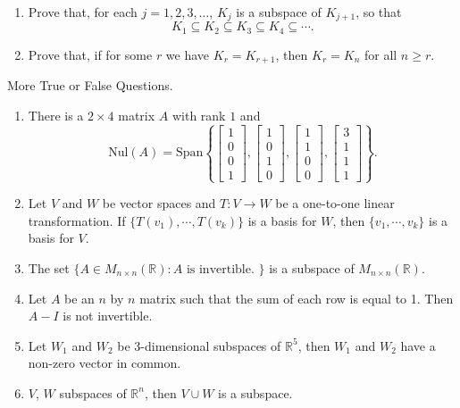 \documentclass[12pt,letterpaper]{article}
\begin{document}
\begin{enumerate}
	\begin{enumerate}
		\item Prove that, for each $j=1,2,3,\ldots$, $K_j$ is a subspace of $K_{j+1}$, so that 
		$$
		K_1\subseteq K_2 \subseteq K_3 \subseteq K_4 \subseteq\cdots.
		$$
		\item Prove that, if for some $r$ we have $K_r = K_{r+1}$, then $K_r=K_n$ for all $n\geq r$.
	\end{enumerate}
	\Problem More True or False Questions.
	\begin{enumerate}
		 \item There is a $2 \times 4$ matrix $A$ with rank $1$ and $$\mathrm{Nul}(A) = \mathrm{Span}\left\{\begin{bmatrix}1\\0\\0\\1\end{bmatrix},\begin{bmatrix}1\\0\\1\\0\end{bmatrix},\begin{bmatrix}1\\1\\0\\0\end{bmatrix},\begin{bmatrix}3\\1\\1\\1\end{bmatrix}\right\}.$$
		\item Let $V$ and $W$ be vector spaces and $T : V \to W$ be a one-to-one linear transformation.  If $\{ T(v_1), \cdots, T(v_k)\}$ is a basis for $W$, then $\{ v_1, \cdots, v_k \}$ is a basis for $V$.
		\item The set $\{A\in M_{n \times n}(\mathbb{R}) : A \text{ is invertible. } \}$ is a subspace of $M_{n \times n} (\mathbb{R})$.
		\item Let $A$ be an $n$ by $n$ matrix such that the sum of each row is equal to 1.  Then $A-I$ is not invertible.
		\item  Let $W_1$ and $W_2$ be 3-dimensional subspaces of $\mathbb{R}^5$, then $W_1$ and $W_2$ have a non-zero vector in common.
		\item $V$, $W$ subspaces of $\mathbb{R}^n$, then $V \cup W$ is a subspace.

\end{enumerate}
\end{enumerate}
\end{document}
